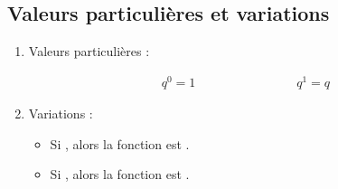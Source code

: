 \documentclass[xcolor={dvipsnames}]{beamer}
\begin{document}
\subsection{Valeurs particulières et variations}
\begin{frame}
\begin{myprops}
	\begin{enumerate}
		\item Valeurs particulières :
		
		\begin{center}
			\begin{align*}
			q^0 = 1 \qquad\qquad\qquad\qquad q^1 = q 			
			\end{align*}
		\end{center}
		
		
		\item Variations :
		\begin{itemize}
			\item Si , alors la fonction est .
			\item Si , alors la fonction est .
		\end{itemize}
	\end{enumerate}
\end{myprops}
\end{frame}
\end{document}
